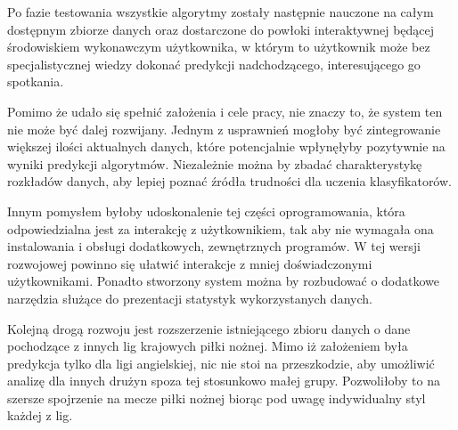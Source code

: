 Po fazie testowania wszystkie algorytmy zostały następnie nauczone na całym dostępnym zbiorze danych oraz dostarczone do powłoki interaktywnej będącej środowiskiem wykonawczym użytkownika, w którym to użytkownik może bez specjalistycznej wiedzy dokonać predykcji nadchodzącego, interesującego go spotkania.

Pomimo że udało się spełnić założenia i cele pracy, nie znaczy to, że system ten nie może być dalej rozwijany. Jednym z usprawnień mogłoby być zintegrowanie większej ilości aktualnych danych, które potencjalnie wpłynęłyby pozytywnie na wyniki predykcji algorytmów. Niezależnie można by zbadać charakterystykę rozkładów danych, aby lepiej poznać źródła trudności dla  uczenia klasyfikatorów.

Innym pomysłem byłoby udoskonalenie tej części oprogramowania, która odpowiedzialna jest za interakcję z użytkownikiem, tak aby nie wymagała ona instalowania i obsługi dodatkowych, zewnętrznych programów. W tej wersji rozwojowej powinno się ułatwić interakcje z mniej doświadczonymi użytkownikami. Ponadto stworzony system można by rozbudować o dodatkowe narzędzia służące do prezentacji statystyk wykorzystanych danych.

Kolejną drogą rozwoju jest rozszerzenie istniejącego zbioru danych o dane pochodzące z innych lig krajowych piłki nożnej. Mimo iż założeniem była predykcja tylko dla ligi angielskiej, nic nie stoi na przeszkodzie, aby umożliwić analizę dla innych drużyn spoza tej stosunkowo małej grupy. Pozwoliłoby to na szersze spojrzenie na mecze piłki nożnej biorąc pod uwagę indywidualny styl każdej z lig.